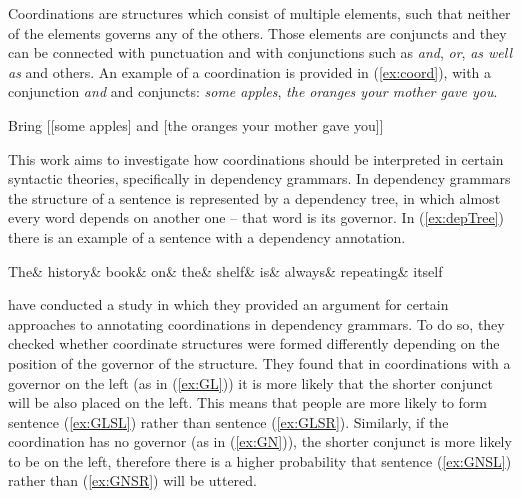 Coordinations are structures which consist of multiple elements, such that neither of the elements governs any of the others. Those elements are conjuncts and they can be connected with punctuation and with conjunctions such as \textsl{and}, \textsl{or}, \textsl{as well as} and others. An example of a coordination is provided in (\ref{ex:coord}), with a conjunction \textsl{and} and conjuncts: \textsl{some apples}, \textsl{the oranges your mother gave you}.

\begin{exe}
    \ex\label{ex:coord}
    Bring [[some apples] and [the oranges your mother gave you]]
\end{exe}

This work aims to investigate how coordinations should be interpreted in certain syntactic theories, specifically in dependency grammars. In dependency grammars the structure of a sentence is represented by a dependency tree, in which almost every word depends on another one -- that word is its governor. In (\ref{ex:depTree}) there is an example of a sentence with a dependency annotation.

\begin{exe}
	\ex\label{ex:depTree}
	\begin{dependency}[baseline=-\the\dimexpr\fontdimen22\textfont2\relax]
	\begin{deptext}
	The\& history\& book\& on\& the\& shelf\& is\& always\& repeating\& itself\\ 
	\end{deptext}
	\end{dependency}
\end{exe}

\cite{prz:woz:23} have conducted a study in which they provided an argument for certain approaches to annotating coordinations in dependency grammars. To do so, they checked whether coordinate structures were formed differently depending on the position of the governor of the structure. They found that in coordinations with a governor on the left (as in (\ref{ex:GL})) it is more likely that the shorter conjunct will be also placed on the left. This means that people are more likely to form sentence (\ref{ex:GLSL}) rather than sentence (\ref{ex:GLSR}). Similarly, if the coordination has no governor (as in (\ref{ex:GN})), the shorter conjunct is more likely to be on the left, therefore there is a higher probability that sentence (\ref{ex:GNSL}) rather than (\ref{ex:GNSR}) will be uttered. 

